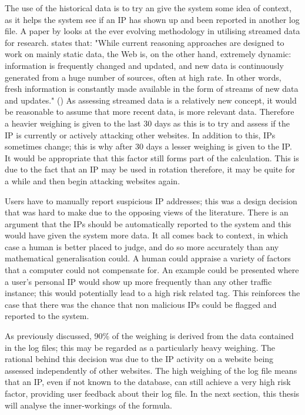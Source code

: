 The use of the historical data is to try an give the system some idea of context, as it helps the system see if an IP has shown up and been reported in another log file. A paper by \citeauthor{reiss2007efficient} looks at the ever evolving methodology in utilising streamed data for research. \citeauthor{reiss2007efficient} states that: "While current reasoning approaches are designed to work on mainly static data, the Web is, on the other hand, extremely dynamic: information is frequently changed and updated, and new data is continuously generated from a huge number of sources, often at high rate. In other words, fresh information is constantly made available in the form of streams of new data and updates." (\cite{reiss2007efficient}) As assessing streamed data is a relatively new concept, it would be reasonable to assume that more recent data, is more relevant data. Therefore a heavier weighing is given to the last 30 days as this is to try and assess if the IP is currently or actively attacking other websites. In addition to this, IPs sometimes change; this is why after 30 days a lesser weighing is given to the IP. It would be appropriate that this factor still forms part of the calculation. This is due to the fact that an IP may be used in rotation therefore, it may be quite for a while and then begin attacking websites again. 

Users have to manually report suspicious IP addresses; this was a design decision that was hard to make due to the opposing views of the literature. There is an argument that the IPs should be automatically reported to the system and this would have given the system more data. It all comes back to context, in which case a human is better placed to judge, and do so more accurately than any mathematical generalisation could. A human could appraise a variety of factors that a computer could not compensate for. An example could be presented where a user's personal IP would show up more frequently than any other traffic instance; this would potentially lead to a high risk related tag. This reinforces the case that there was the chance that non malicious IPs could be flagged and reported to the system. 

As previously discussed, 90\% of the weighing is derived from the data contained in the log files; this may be regarded as a particularly heavy weighing. The rational behind this decision was due to the IP activity on a website being assessed independently of other websites. The high weighing of the log file means that an IP, even if not known to the database, can still achieve a very high risk factor, providing user feedback about their log file. In the next section, this thesis will analyse the inner-workings of the formula.

